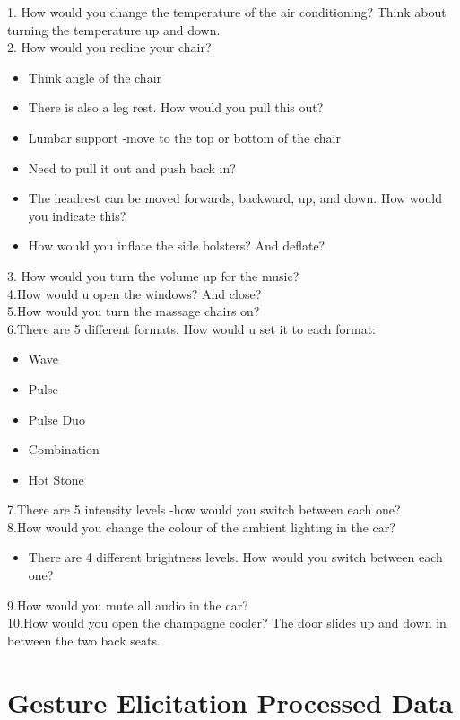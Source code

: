 \documentclass{l4proj}
\begin{document}
\begin{appendices}
1. How would you change the temperature of the air conditioning? Think about turning the temperature up and down.\\
2. How would you recline your chair?
\begin{itemize}
    \item Think angle of the chair
    \item There is also a leg rest. How would you pull this out?
    \item Lumbar support -move to the top or bottom of the chair
    \item Need to pull it out and push back in?
    \item The headrest can be moved forwards, backward, up, and down. How would you indicate this?
    \item How would you inflate the side bolsters? And deflate?
\end{itemize}
3. How would you turn the volume up for the music?\\
4.How would u open the windows? And close?\\
5.How would you turn the massage chairs on?\\
6.There are 5 different formats. How would u set it to each format:
\begin{itemize}
    \item Wave
    \item Pulse
    \item Pulse Duo
    \item Combination
    \item Hot Stone
\end{itemize}
7.There are 5 intensity levels -how would you switch between each one?\\
8.How would you change the colour of the ambient lighting in the car?
\begin{itemize}
    \item There are 4 different brightness levels. How would you switch between each one?
\end{itemize}
9.How would you mute all audio in the car?\\
10.How would you open the champagne cooler? The door slides up and down in between the two back seats.

\section{Gesture Elicitation Processed Data}
\label{section:analysisGE}



\end{appendices}
\end{document}
